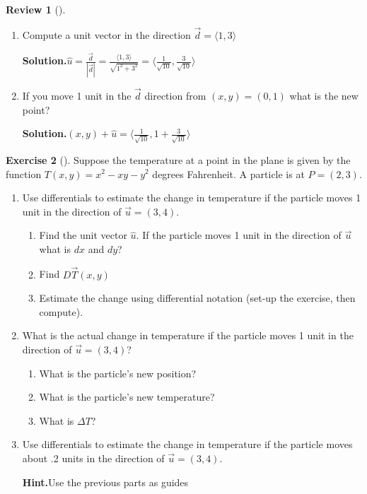 \documentclass[10pt,]{book}
\theoremstyle{plain}
\theoremstyle{definition}
\theoremstyle{definition}
\theoremstyle{definition}
\newtheorem{project}{Review}[section]
\theoremstyle{definition}
\newtheorem{exploration}[project]{Exercise}
\theoremstyle{definition}
\numberwithin{equation}{section}
\begin{document}
\begin{project}[]\label{project-22}
\leavevmode%
\begin{enumerate}[font=\bfseries,label=(\alph*),ref=\alph*]
\item\label{task-598} Compute a unit vector in the direction \(\vec{d}=\langle 1,3 \rangle\)%
\par\medskip\noindent%
\textbf{Solution.}\quad \(\hat{u}=\frac{\vec{d}}{|\vec{d}|}=\frac{\langle 1,3 \rangle}{\sqrt{1^2+3^2}}=\langle \frac{1}{\sqrt{10}}, \frac{3}{\sqrt{10}} \rangle\)%
\item\label{task-599} If you move 1 unit in the \(\vec{d}\) direction from \((x,y)=(0,1)\) what is the new point?%
\par\medskip\noindent%
\textbf{Solution.}\quad \((x,y)+\hat{u}=\langle \frac{1}{\sqrt{10}}, 1+\frac{3}{\sqrt{10}} \rangle\)%
\end{enumerate}
\end{project}
\begin{exploration}[]\label{exploration-224}
Suppose the temperature at a point in the plane is given by the function {\(T(x,y)=x^2-xy-y^2\)} degrees Fahrenheit. A particle is at \(P=(2,3)\).%
\begin{enumerate}[font=\bfseries,label=(\alph*),ref=\alph*]
\item\label{task-600} Use differentials to estimate the change in temperature if the particle moves 1 unit in the direction of \(\vec u=\left(3,4\right)\).%
\begin{enumerate}[font=\bfseries,label=(\roman*),ref=\theenumi.\roman*]
\item\label{task-601} Find the unit vector \(\hat{u}\). If the particle moves 1 unit in the direction of \(\vec{u}\) what is \(dx\) and \(dy\)?%
\item\label{task-602} Find \(D\vec{T}(x,y)\)%
\item\label{task-603} Estimate the change using differential notation (set-up the exercise, then compute).%
\end{enumerate}
\item\label{task-604} What is the actual change in temperature if the particle moves 1 unit in the direction of \(\vec u=\left(3,4\right)\)?%
\begin{enumerate}[font=\bfseries,label=(\roman*),ref=\theenumi.\roman*]
\item\label{task-605} What is the particle's new position?%
\item\label{task-606} What is the particle's new temperature?%
\item\label{task-607} What is \(\Delta T\)?%
\end{enumerate}
\item\label{task-608} Use differentials to estimate the change in temperature if the particle moves about .2 units in the direction of \(\vec u=\left(3,4\right)\).%
\par\medskip\noindent%
\textbf{Hint.}\quad Use the previous parts as guides%
\end{enumerate}
\end{exploration}
\end{document}
